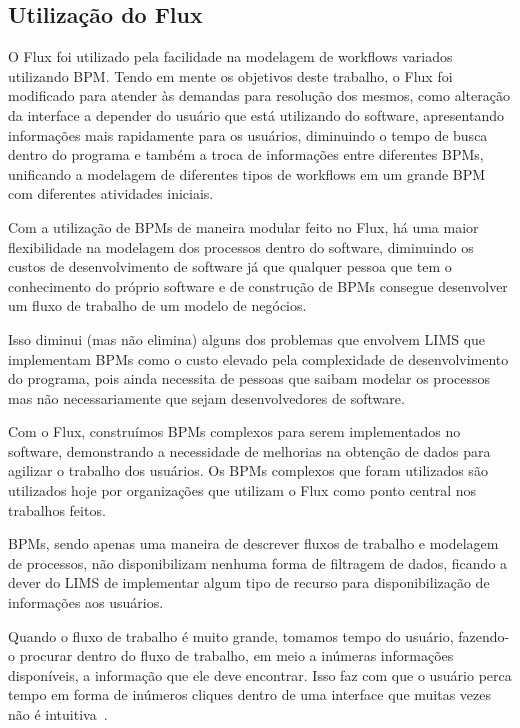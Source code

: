 
\subsection{Utilização do Flux}

O Flux foi utilizado pela facilidade na modelagem de workflows variados utilizando BPM. Tendo em mente os objetivos deste trabalho, o Flux foi modificado para atender às demandas para resolução dos mesmos, como alteração da interface a depender do usuário que está utilizando do software, apresentando informações mais rapidamente para os usuários, diminuindo o tempo de busca dentro do programa e também a troca de informações entre diferentes BPMs, unificando a modelagem de diferentes tipos de workflows em um grande BPM com diferentes atividades iniciais.


Com a utilização de BPMs de maneira modular feito no Flux, há uma maior flexibilidade na modelagem dos processos dentro do software, diminuindo os custos de desenvolvimento de software já que qualquer pessoa que tem o conhecimento do próprio software e de construção de BPMs consegue desenvolver um fluxo de trabalho de um modelo de negócios.

Isso diminui (mas não elimina) alguns dos problemas que envolvem LIMS que implementam BPMs como o custo elevado pela complexidade de desenvolvimento do programa, pois ainda necessita de pessoas que saibam modelar os processos mas não necessariamente que sejam desenvolvedores de software.


Com o Flux, construímos BPMs complexos para serem implementados no software, demonstrando a necessidade de melhorias na obtenção de dados para agilizar o trabalho dos usuários. Os BPMs complexos que foram utilizados são utilizados hoje por organizações que utilizam o Flux como ponto central nos trabalhos feitos.

BPMs, sendo apenas uma maneira de descrever fluxos de trabalho e modelagem de processos, não disponibilizam nenhuma forma de filtragem de dados, ficando a dever do LIMS de implementar algum tipo de recurso para disponibilização de informações aos usuários.

Quando o fluxo de trabalho é muito grande, tomamos tempo do usuário, fazendo-o procurar dentro do fluxo de trabalho, em meio a inúmeras informações disponíveis, a informação que ele deve encontrar. Isso faz com que o usuário perca tempo em forma de inúmeros cliques dentro de uma interface que muitas vezes não é intuitiva~\cite{OvationIncNeeded:LIMS}.

